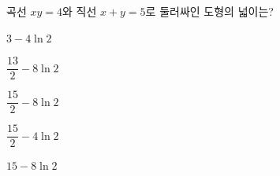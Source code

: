 \hspace*{2mm}\begin{minipage}[t]{\dimexpr\linewidth-2mm\relax}\vspace{0pt}
곡선 $xy=4$와 직선 $x+y=5$로 둘러싸인 도형의 넓이는?
\begin{choices32}{\rule[-3ex]{0pt}{8ex}$3-4\ln 2$}{\rule[-3ex]{0pt}{8ex}$\dfrac{13}{2}-8\ln 2$}{\rule[-3ex]{0pt}{8ex}$\dfrac{15}{2}-8\ln 2$}{\rule[-3ex]{0pt}{8ex}$\dfrac{15}{2}-4\ln 2$}{\rule[-3ex]{0pt}{8ex}$15-8\ln 2$}\end{choices32}\end{minipage}
